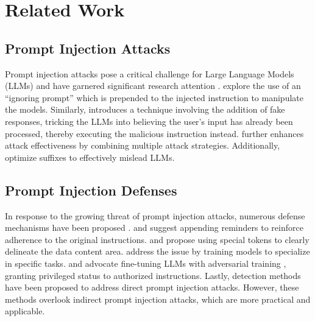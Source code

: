 \section{Related Work}
\subsection{Prompt Injection Attacks}
Prompt injection attacks pose a critical challenge for Large Language Models (LLMs) and have garnered significant research attention  \cite{perez2022ignore, willison_2023, liu2023prompt, li2023evaluating, liu2024formalizing, zhan2024injecagent, shi2024optimization, liu2024automatic, shafran2024machine, huang2024semantic, breitenbach2023dont}. \citet{perez2022ignore} explore the use of an ``ignoring prompt'' which is prepended to the injected instruction to manipulate the models. Similarly, \citet{willison_2023} introduces a technique involving the addition of fake responses, tricking the LLMs into believing the user’s input has already been processed, thereby executing the malicious instruction instead. \citet{yi2023benchmarking} further enhances attack effectiveness by combining multiple attack strategies. Additionally, \citet{liu2024automatic} optimize suffixes to effectively mislead LLMs.

\subsection{Prompt Injection Defenses}
In response to the growing threat of prompt injection attacks, numerous defense mechanisms have been proposed  \cite{sandwich_defense_2023, hines2024defending, willison_2023, chen2024struq, wallace2024instruction, yi2023benchmarking, piet2023jatmo, suo2024signed}. \citet{sandwich_defense_2023} and \citet{yi2023benchmarking} suggest appending reminders to reinforce adherence to the original instructions.  \citet{hines2024defending} and \citet{ willison_2023} propose using special tokens to clearly delineate the data content area. \citet{piet2023jatmo} address the issue by training models to specialize in specific tasks. \citet{chen2024struq} and \citet{ wallace2024instruction} advocate fine-tuning LLMs with adversarial training \cite{mkadry2017towards}, granting privileged status to authorized instructions. Lastly, detection methods \cite{deberta-v3-base-prompt-injection-v2, meta2024prompt, gorman2022jailbreaking} have been proposed to address direct prompt injection attacks. However, these methods overlook indirect prompt injection attacks, which are more practical and applicable.